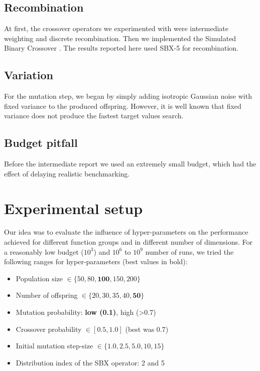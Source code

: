 \documentclass{sig-alternate}
\begin{document}
\subsection{Recombination}

At first, the crossover operators we experimented with were intermediate weighting and discrete recombination. Then we implemented the Simulated Binary Crossover \cite{deb1994simulated}. The results reported here used SBX-5 for recombination.

\subsection{Variation}

For the mutation step, we began by simply adding isotropic Gaussian noise with fixed variance to the produced offspring. However, it is well known that fixed variance does not produce the fastest target values search.


\subsection*{Budget pitfall} Before the intermediate report we used an extremely small budget, which had the effect of delaying  realistic benchmarking.

\section{Experimental setup}
Our idea was to evaluate the influence of hyper-parameters on the performance achieved for different function groups and in different number of dimensions. For a reasonably low budget ($10^3$) and $10^6$ to $10^9$ number of runs, we tried the following ranges for hyper-parameters (best values in bold):
\begin{itemize}
\item Population size $\in \{50, 80, \bm{100}, 150, 200\}$
\item Number of offspring $\in \{20, 30, 35, 40, \bm{50}\}$
\item Mutation probability: \textbf{low (0.1)}, high (>0.7)
\item Crossover probability $\in {[0.5, 1.0]}$ (best was $\bm{0.7}$)
\item Initial mutation step-size $\in \{1.0, 2.5, \bm{5.0}, 10, 15\}$
\item Distribution index of the SBX operator: 2 and 5
\end{itemize}
\end{document}
